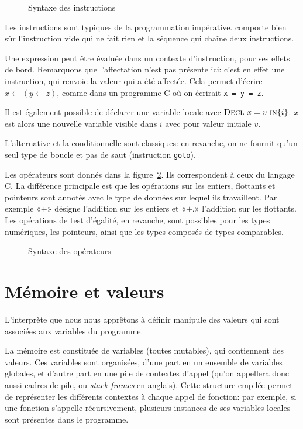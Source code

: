\begin{figure}%

  \figstxinstr{}

  \caption{Syntaxe des instructions}
\label{fig:stx}
\end{figure}%

Les instructions sont typiques de la programmation impérative. \langname
comporte bien sûr l'instruction vide qui ne fait rien et la séquence qui chaîne
deux instructions.

Une expression peut être évaluée dans un contexte d'instruction, pour ses effets
de bord. Remarquons que l'affectation n'est pas présente ici: c'est en effet une
instruction, qui renvoie la valeur qui a été affectée. Cela permet d'écrire $x ←
(y ← z)$, comme dans un programme C où on écrirait \texttt{x = y = z}.

Il est également possible de déclarer une variable locale avec
$\textsc{Decl}~x=v~\textsc{in}\{i\}$. $x$ est alors une nouvelle variable visible dans $i$ avec
pour valeur initiale $v$.

L'alternative et la conditionnelle sont classiques: en revanche, on ne fournit
qu'un seul type de boucle et pas de saut (instruction \texttt{goto}).

Les opérateurs sont donnés dans la figure~\ref{fig:stx-ops}. Ils correspondent
à ceux du langage C. La différence principale est que les opérations sur les
entiers, flottants et pointeurs sont annotés avec le type de données sur lequel
ils travaillent. Par exemple «$+$» désigne l'addition sur les entiers et «$+.$»
l'addition sur les flottants. Les opérations de test d'égalité, en revanche,
sont possibles pour les types numériques, les pointeurs, ainsi que les
types composés de types comparables.

\begin{figure}[h]%

  \figstxops{}

  \caption{Syntaxe des opérateurs}
\label{fig:stx-ops}
\end{figure}%

\section{Mémoire et valeurs}

L'interprète que nous nous apprêtons à définir manipule des valeurs qui sont
associées aux variables du programme.

La mémoire est constituée de variables (toutes mutables), qui contiennent des
valeurs. Ces variables sont organisées, d'une part en un ensemble de variables
globales, et d'autre part en une pile de contextes d'appel (qu'on appellera donc
aussi cadres de pile, ou \emph{stack frames} en anglais). Cette structure
empilée permet de représenter les différents contextes à chaque appel de
fonction: par exemple, si une fonction s'appelle récursivement, plusieurs
instances de ses variables locales sont présentes dans le programme.

